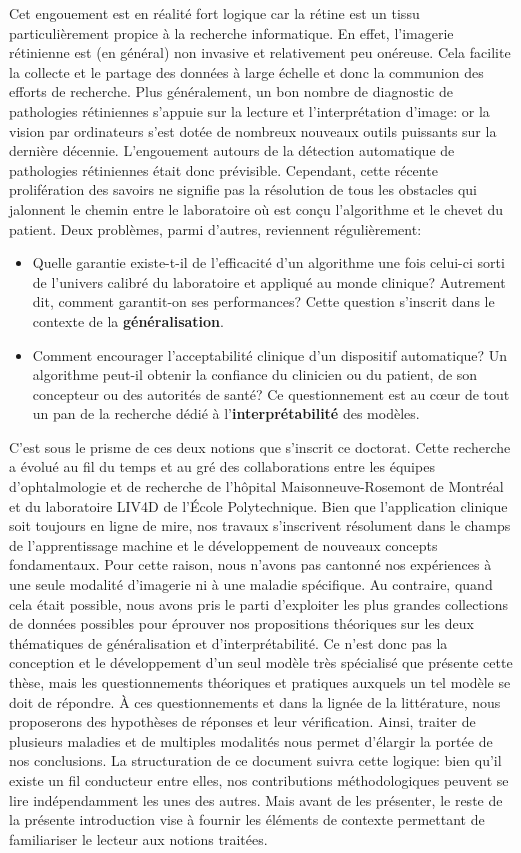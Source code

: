 Cet engouement est en réalité fort logique car la rétine est un tissu particulièrement propice à la recherche informatique. En effet, l'imagerie rétinienne est (en général) non invasive et relativement peu onéreuse. Cela facilite la collecte et le partage des données à large échelle et donc la communion des efforts de recherche. Plus généralement, un bon nombre de diagnostic de pathologies rétiniennes s'appuie sur la lecture et l'interprétation d'image: or la vision par ordinateurs s'est dotée de nombreux nouveaux outils puissants sur la dernière décennie. L'engouement autours de la détection automatique de pathologies rétiniennes était donc prévisible. 
Cependant, cette récente prolifération des savoirs ne signifie pas la résolution de tous les obstacles qui jalonnent le chemin entre le laboratoire où est conçu l'algorithme  et le chevet du patient. Deux problèmes, parmi d'autres, reviennent régulièrement:
\begin{itemize}
	\item Quelle garantie existe-t-il de l'efficacité d'un algorithme une fois celui-ci sorti de l'univers calibré du laboratoire et appliqué au monde clinique? Autrement dit, comment garantit-on ses performances? Cette question s'inscrit dans le contexte de la \textbf{généralisation}.
	\item Comment encourager l'acceptabilité clinique d'un dispositif automatique? Un algorithme peut-il obtenir la confiance du clinicien ou du patient, de son concepteur ou des autorités de santé? Ce questionnement est au c\oe{}ur de tout un pan de la recherche dédié à l'\textbf{interprétabilité} des modèles. 
\end{itemize}
C'est sous le prisme de ces deux notions que s'inscrit ce doctorat. Cette recherche a évolué au fil du temps et au gré des collaborations entre les équipes d'ophtalmologie et de recherche de l'hôpital Maisonneuve-Rosemont de Montréal et du laboratoire LIV4D de l'École Polytechnique. Bien que l'application clinique soit toujours en ligne de mire, nos travaux s'inscrivent résolument dans le champs de l'apprentissage machine et le développement de nouveaux concepts fondamentaux. Pour cette raison, nous n'avons pas cantonné nos expériences à une seule modalité d'imagerie ni à une maladie spécifique. Au contraire, quand cela était possible, nous avons pris le parti d'exploiter les plus grandes collections de données possibles pour éprouver nos propositions théoriques sur les deux thématiques de généralisation et d'interprétabilité. Ce n'est donc pas la conception et le développement d'un seul modèle très spécialisé que présente cette thèse, mais les questionnements théoriques et pratiques auxquels un tel modèle se doit de répondre. À ces questionnements et dans la lignée de la littérature, nous proposerons des hypothèses de réponses et leur vérification. Ainsi, traiter de plusieurs maladies et de multiples modalités nous permet d'élargir la portée de nos conclusions. La structuration de ce document suivra cette logique: bien qu'il existe un fil conducteur entre elles, nos contributions méthodologiques peuvent se lire indépendamment les unes des autres. Mais avant de les présenter, le reste de la présente introduction vise à fournir les éléments de contexte permettant de familiariser le lecteur aux notions traitées.



